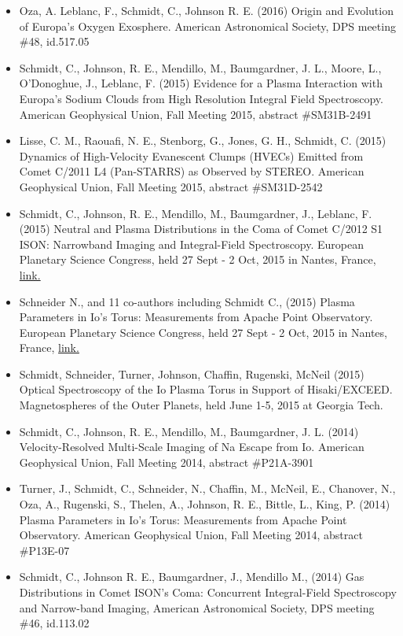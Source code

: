 \documentclass[12pt]{report}
\begin{document}
\begin{itemize}
   \item Oza, A. Leblanc, F., Schmidt, C., Johnson R. E. (2016) Origin and Evolution of Europa's Oxygen Exosphere. American Astronomical Society, DPS meeting \#48, id.517.05
   \item Schmidt, C., Johnson, R. E., Mendillo, M., Baumgardner, J. L., Moore, L., O'Donoghue, J., Leblanc, F. (2015) Evidence for a Plasma Interaction with Europa's Sodium Clouds from High Resolution Integral Field Spectroscopy. American Geophysical Union, Fall Meeting 2015, abstract \#SM31B-2491
   \item Lisse, C. M., Raouafi, N. E., Stenborg, G., Jones, G. H., Schmidt, C. (2015) Dynamics of High-Velocity Evanescent Clumps (HVECs) Emitted from Comet C/2011 L4 (Pan-STARRS) as Observed by STEREO. American Geophysical Union, Fall Meeting 2015, abstract \#SM31D-2542
   \item Schmidt, C., Johnson, R. E., Mendillo, M., Baumgardner, J., Leblanc, F. (2015) Neutral and Plasma Distributions in the Coma of Comet C/2012 S1 ISON: Narrowband Imaging and Integral-Field Spectroscopy. European Planetary Science Congress, held 27 Sept - 2 Oct, 2015 in Nantes, France, \href{https://meetingorganizer.copernicus.org/EPSC2015/EPSC2015-315-2.pdf}{link.} 
   \item Schneider N., and 11 co-authors including Schmidt C., (2015) Plasma Parameters in Io's Torus: Measurements from Apache Point Observatory. European Planetary Science Congress, held 27 Sept - 2 Oct, 2015 in Nantes, France, \href{https://meetingorganizer.copernicus.org/EPSC2015/EPSC2015-418-1.pdf}{link.} 
   \item Schmidt, Schneider, Turner, Johnson, Chaffin, Rugenski, McNeil (2015) Optical Spectroscopy of the Io Plasma Torus in Support of Hisaki/EXCEED. Magnetospheres of the Outer Planets, held June 1-5, 2015 at Georgia Tech.
   \item Schmidt, C., Johnson, R. E., Mendillo, M., Baumgardner, J. L. (2014) Velocity-Resolved Multi-Scale Imaging of Na Escape from Io. American Geophysical Union, Fall Meeting 2014, abstract \#P21A-3901
   \item Turner, J., Schmidt, C., Schneider, N., Chaffin, M., McNeil, E., Chanover, N., Oza, A., Rugenski, S., Thelen, A., Johnson, R. E., Bittle, L., King, P. (2014) Plasma Parameters in Io's Torus: Measurements from Apache Point Observatory. American Geophysical Union, Fall Meeting 2014, abstract \#P13E-07
   \item Schmidt, C., Johnson R. E., Baumgardner, J., Mendillo M., (2014) Gas Distributions in Comet ISON's Coma: Concurrent Integral-Field Spectroscopy and Narrow-band Imaging, American Astronomical Society, DPS meeting \#46, id.113.02

\end{itemize}
\end{document}
